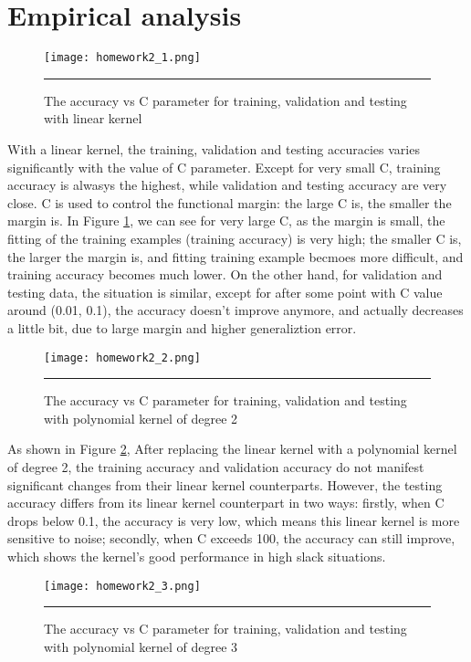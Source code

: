 \documentclass[12pt]{article}
\begin{document}
\section{Empirical analysis}
\begin{figure}[htb]
  \centering
      {\texttt{[image: homework2\_1.png]}} \rule{1\linewidth}{1pt}
      \caption{The accuracy vs C parameter for training, validation and testing with linear kernel}
      \label{fig:accuracy1}
\end{figure}
With a linear kernel, the training, validation and testing accuracies varies significantly with the value of C parameter. Except for very small C, training accuracy is alwasys the highest, while validation and testing accuracy are very close. C is used to control the functional margin: the large C is, the smaller the margin is. In Figure \ref{fig:accuracy1}, we can see for very large C, as the margin is small, the fitting of the training examples (training accuracy) is very high; the smaller C is, the larger the margin is, and fitting training example becmoes more difficult, and training accuracy becomes much lower. On the other hand, for validation and testing data, the situation is similar, except for  after some point with C value around  (0.01, 0.1), the accuracy doesn't improve anymore, and actually decreases a little bit, due to large margin and higher generaliztion error.
\begin{figure}[htb]
  \centering
      {\texttt{[image: homework2\_2.png]}} \rule{1\linewidth}{1pt}
      \caption{The accuracy vs C parameter for training, validation and testing with polynomial kernel of degree 2}
      \label{fig:accuracy2}
\end{figure}
As shown in Figure \ref{fig:accuracy2}, After replacing the linear kernel with a polynomial kernel of degree 2, the training accuracy and validation accuracy do not manifest significant changes from their linear kernel counterparts. However, the testing accuracy differs from its linear kernel counterpart in two ways: firstly, when C drops below 0.1, the accuracy is very low, which means this linear kernel is more sensitive to noise; secondly, when C exceeds 100, the accuracy can still improve, which shows the kernel's good performance in high slack situations.
\begin{figure}[htb]
  \centering
      {\texttt{[image: homework2\_3.png]}} \rule{1\linewidth}{1pt}
      \caption{The accuracy vs C parameter for training, validation and testing with polynomial kernel of degree 3}
      \label{fig:accuracy3}
\end{figure}
\end{document}
